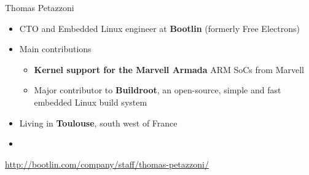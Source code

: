 \begin{frame}{Thomas Petazzoni}
  \begin{itemize}
  \item CTO and Embedded Linux engineer at {\bf Bootlin} (formerly Free
        Electrons)
  \item Main contributions
    \begin{itemize}
    \item {\bf Kernel support for the Marvell Armada} ARM SoCs from
      Marvell
    \item Major contributor to {\bf Buildroot}, an open-source, simple and
      fast embedded Linux build system
    \end{itemize}
  \item Living in {\bf Toulouse}, south west of France
  \item {}
  \end{itemize}
  {\small \url{http://bootlin.com/company/staff/thomas-petazzoni/}}
\end{frame}

